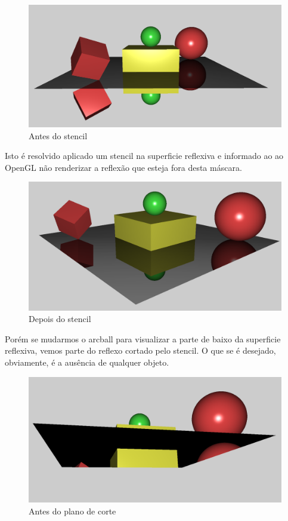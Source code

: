 \documentclass[11pt, a4paper]{article}
\begin{document}
\begin{figure}[H]
  \begin{center}
  \includegraphics[width=0.8\linewidth]{before-stencil.png}
  \caption{Antes do stencil}
  \label{fig:vaz}
  \end{center}
\end{figure}

Isto é resolvido aplicado um stencil na superficie reflexiva e informado ao 
ao OpenGL não renderizar a reflexão que esteja fora desta máscara.

\begin{figure}[H]
  \begin{center}
  \includegraphics[width=0.8\linewidth]{after-stencil.png}
  \caption{Depois do stencil}
  \label{fig:vaz}
  \end{center}
\end{figure}

Porém se mudarmos o arcball para visualizar a parte de baixo da superficie reflexiva, 
vemos parte do reflexo cortado pelo stencil. O que se é desejado, obviamente, é 
a ausência de qualquer objeto.

\begin{figure}[H]
  \begin{center}
  \includegraphics[width=0.8\linewidth]{before-cut-plan.png}
  \caption{Antes do plano de corte}
  \label{fig:vaz}
  \end{center}
\end{figure}
\end{document}
